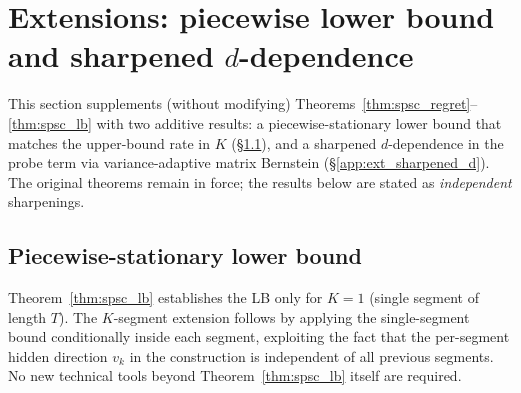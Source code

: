 %
%
%
%

\section{Extensions: piecewise lower bound and sharpened \texorpdfstring{$d$}{d}-dependence}
\label{app:extensions}

This section supplements (without modifying) Theorems~\ref{thm:spsc_regret}--\ref{thm:spsc_lb}
with two additive results: a piecewise-stationary lower bound that
matches the upper-bound rate in $K$ (\S\ref{app:ext_piecewise_lb}),
and a sharpened $d$-dependence in the probe term via variance-adaptive
matrix Bernstein (\S\ref{app:ext_sharpened_d}). The original theorems
remain in force; the results below are stated as \emph{independent}
sharpenings.

\subsection{Piecewise-stationary lower bound}
\label{app:ext_piecewise_lb}

Theorem~\ref{thm:spsc_lb} establishes the LB only for $K=1$ (single
segment of length $T$). The $K$-segment extension follows by applying
the single-segment bound conditionally inside each segment, exploiting
the fact that the per-segment hidden direction $v_k$ in the
construction is independent of all previous segments. No new technical
tools beyond Theorem~\ref{thm:spsc_lb} itself are required.

